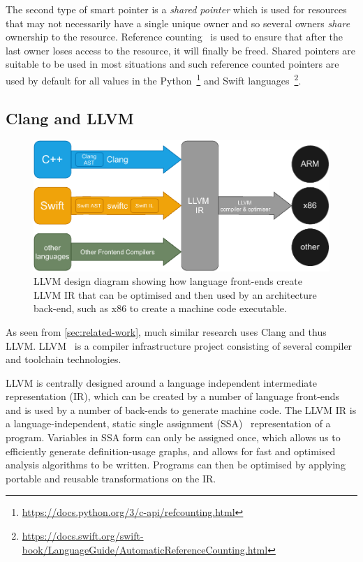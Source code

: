\documentclass{mpaper}
\begin{document}
    The second type of smart pointer is a \emph{shared pointer} which is used for resources that may not necessarily have a single unique owner and so several owners \emph{share} ownership to the resource.
    Reference counting~\cite{Collins1960} is used to ensure that after the last owner loses access to the resource, it will finally be freed.
    Shared pointers are suitable to be used in most situations and such reference counted pointers are used by default for all values in the Python~\footnote{\url{https://docs.python.org/3/c-api/refcounting.html}} and Swift languages~\footnote{\url{https://docs.swift.org/swift-book/LanguageGuide/AutomaticReferenceCounting.html}}.
    
    \subsection{Clang and LLVM}\label{subsec:clang-and-llvm}
    
    \begin{figure}
        \centering
        \includegraphics[scale=0.75]{images/llvm.pdf}
        \caption{LLVM design diagram showing how language front-ends create LLVM IR that can be optimised and then used by an architecture back-end, such as x86 to create a machine code executable.}
        \label{fig:llvm-design}
    \end{figure}  
    
    As seen from \autoref{sec:related-work}, much similar research uses Clang and thus LLVM.
    LLVM~\cite{Lattner2004} is a compiler infrastructure project consisting of several compiler and toolchain technologies. 
    
    LLVM is centrally designed around a language independent intermediate representation (IR), which can be created by a number of language front-ends and is used by a number of back-ends to generate machine code. 
    The LLVM IR is a language-independent, static single assignment (SSA)~\cite{Rosen1988} representation of a program.
    Variables in SSA form can only be assigned once, which allows us to efficiently generate definition-usage graphs, and allows for fast and optimised analysis algorithms to be written.
    Programs can then be optimised by applying portable and reusable transformations on the IR.
    
\end{document}
